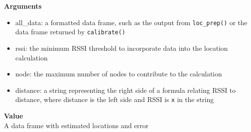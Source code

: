 \documentclass[
]{book}
\providecommand{\tightlist}{%
  \setlength{\itemsep}{0pt}\setlength{\parskip}{0pt}}
\begin{document}
\textbf{Arguments}

\begin{itemize}
\tightlist
\item
  all\_data: a formatted data frame, such as the output from \texttt{loc\_prep()} or the data frame returned by \texttt{calibrate()}\\
\item
  rssi: the minimum RSSI threshold to incorporate data into the location calculation\\
\item
  node: the maximum number of nodes to contribute to the calculation\\
\item
  distance: a string representing the right side of a formula relating RSSI to distance, where distance is the left side and RSSI is \texttt{x} in the string
\end{itemize}

\textbf{Value}\\
A data frame with estimated locations and error

  
\end{document}

